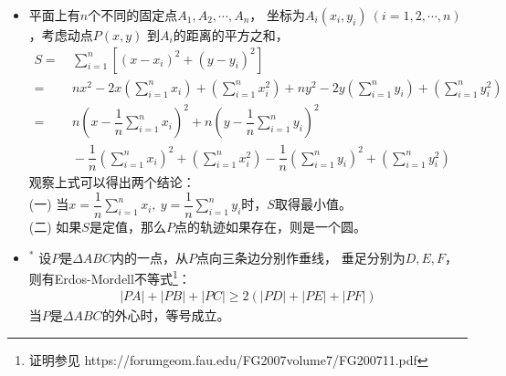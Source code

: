 \begin{itemize}[leftmargin=\inteval{\myitemleftmargin}pt,itemsep=
   \inteval{\myitemitempsep}pt,topsep=\inteval{\myitemtopsep}pt]
$ P $点是$ \Delta ABC $的垂心。\\
 当$ \lambda_1=\sin A,\ \lambda_2=\sin B,\ \lambda_3=
\sin C $时，
\begin{align*}
    x &=\dfrac{(\sin A)x_1+(\sin B)x_2+(\sin C)x_3}{\sin A+\sin B+
        \sin C}=\dfrac{ax_1+bx_2+cx_3}{a+b+c} \\ 
    y &=\dfrac{(\sin A)y_1+(\sin B)y_2+(\sin C)y_3}{\sin A+\sin B+
        \sin C}=\dfrac{ay_1+by_2+cy_3}{a+b+c}
\end{align*}
$ P $点是$ \Delta ABC $的内心。\\
 当$ \lambda_1=\sin 2A,\ \lambda_2=\sin 2B,\ \lambda_3=
\sin 2C $时，
\begin{align*}
    x &=\dfrac{(\sin 2A)x_1+(\sin 2B)x_2+(\sin 2C)x_3}{\sin 2A+
        \sin 2B+\sin 2C} \\
    y &=\dfrac{(\sin 2A)y_1+(\sin 2B)y_2+(\sin 2C)y_3}{\sin 2A+
        \sin 2B+\sin 2C}
\end{align*}
$ P $点是$ \Delta ABC $的外心。

\item 平面上有$ n $个不同的固定点$ A_1,A_2,\cdots,A_n $，
坐标为$ A_i(x_i,y_i)\ (i=1,2,\cdots,n) $，考虑动点$ P(x,y) $
到$ A_i $的距离的平方之和，
\begin{align*}
    S=&\ \sum_{i=1}^n \left[(x-x_i)^2+(y-y_i)^2\right] \\
    =&\ nx^2-2x\left(\sum_{i=1}^n x_i\right)+
    \left(\sum_{i=1}^n x_i^2\right)+ny^2-2y
    \left(\sum_{i=1}^n y_i\right)+
    \left(\sum_{i=1}^ny_i^2\right) \\
    =&\ n\left(x-\dfrac{1}{n}\sum_{i=1}^n x_i\right)^2+
    n\left(y-\dfrac{1}{n}\sum_{i=1}^n y_i\right)^2 \\
    &\ -\dfrac{1}{n}\left(\sum_{i=1}^n x_i\right)^2+
    \left(\sum_{i=1}^n x_i^2\right)
    -\dfrac{1}{n}\left(\sum_{i=1}^n y_i\right)^2+
    \left(\sum_{i=1}^n y_i^2\right)
\end{align*}
观察上式可以得出两个结论：\\
(一) 当$ x=\dfrac{1}{n}\sum\limits_{i=1}^n x_i,\ 
y=\dfrac{1}{n}\sum\limits_{i=1}^n y_i $时，$ S $取得最小值。\\
(二) 如果$ S $是定值，那么$ P $点的轨迹如果存在，则是一个圆。

\item $^*$ 设$ P $是$ \Delta ABC $内的一点，从$ P $点向三条边分别作垂线，
垂足分别为$ D,E,F $，则有Erdos-Mordell不等式\footnote{证明参见
https://forumgeom.fau.edu/FG2007volume7/FG200711.pdf }：
\begin{gather*}
    |PA|+|PB|+|PC|\geq 2(|PD|+|PE|+|PF|)
\end{gather*}
当$ P $是$ \Delta ABC $的外心时，等号成立。


\end{itemize}
